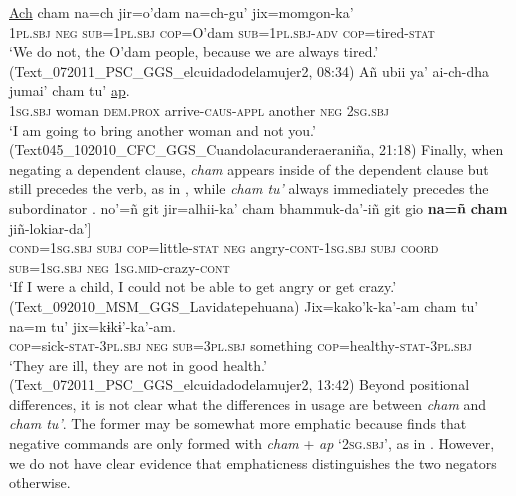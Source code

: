 \documentclass[output=paper,draft,draftmode,colorlinks,citecolor=brown]{langscibook}
\begin{document}
\z 
\ea
\label{ex:odam-alwaystire}
\gll \uline{Ach} 		cham 	na=ch 			jir=o’dam 		na=ch-gu' 	jix=momgon-ka’\\
\textsc{1pl.sbj} 	\textsc{neg} 	\textsc{sub=1pl.sbj} 	\textsc{cop}=O'dam 	\textsc{sub=1pl.sbj-adv}	\textsc{cop}=tired-\textsc{stat}\\
\glt ‘We do not, the O’dam people, because we are always tired.’ (Text\_072011\_PSC\_GGS\_elcuidadodelamujer2, 08:34)
\z 
\ea
\label{ex:odam-anotherwom}
\gll Añ      		ubii  		ya'	ai-ch-dha jumai' 		{cham tu'}       \uline{ap}.\\
\textsc{1sg.sbj} 	woman		\textsc{dem.prox} 	arrive-\textsc{caus-appl}	another		\textsc{neg} \textsc{2sg.sbj}\\
\glt ‘I am going to bring another woman and not you.’
(Text045\_102010\_CFC\_GGS\_Cuandolacuranderaeraniña, 21:18)
\z 
Finally, when negating a dependent clause, \emph{cham} appears inside of the dependent clause but still precedes the verb, as in , while \emph{cham tu'} always immediately precedes the subordinator .
\ea
\label{ex:odam-chamdep}
\gll no’=ñ git jir=alhii-ka’ cham bhammuk-da’-iñ git gio {\ob}\textbf{na=ñ} \textbf{cham} jiñ-lokiar-da’]\\
\textsc{cond=1sg.sbj} \textsc{subj} \textsc{cop}=little-\textsc{stat} \textsc{neg} angry-\textsc{cont-1sg.sbj} \textsc{subj} \textsc{coord} \textsc{sub=1sg.sbj} \textsc{neg} \textsc{1sg.mid}-crazy-\textsc{cont}\\
\glt `If I were a child, I could not be able to get angry or get crazy.'
(Text\_092010\_MSM\_GGS\_Lavidatepehuana)
\z
\ea
\label{ex:odam-chamtudep}
\gll Jix=kako’k-ka’-am {cham tu’} na=m tu’ jix=kɨkɨ’-ka’-am.\\
\textsc{cop}=sick-\textsc{stat-3pl.sbj} \textsc{neg} \textsc{sub=3pl.sbj} something \textsc{cop}=healthy-\textsc{stat-3pl.sbj}\\
\glt ‘They are ill, they are not in good health.’
(Text\_072011\_PSC\_GGS\_elcuidadodelamujer2, 13:42)
\z
Beyond positional differences, it is not clear what the differences in usage are between \emph{cham} and \emph{cham tu'}. The former may be somewhat more emphatic because \citet[136--140]{garcia2014} finds that negative commands are only formed with \emph{cham} + \emph{ap} `\textsc{2sg.sbj}', as in . However, we do not have clear evidence that emphaticness distinguishes the two negators otherwise.
\ea
\label{ex:odam-negcomm}
\end{document}
